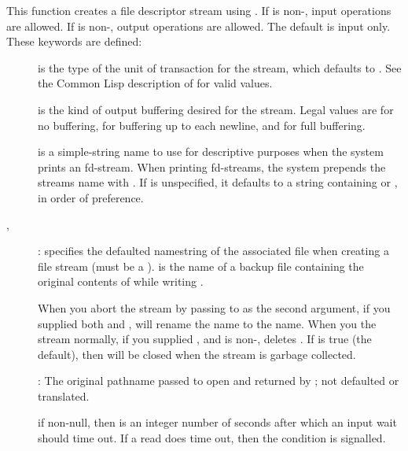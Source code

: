 {This function creates a file descriptor stream using .
If  is non-\nil, input operations are allowed.  If
 is non-\nil, output operations are allowed.  The default is
input only.  These keywords are defined:
\begin{description}
\item[] is the type of the unit of transaction for the
stream, which defaults to .  See the Common Lisp
description of  for valid values.

\item[] is the kind of output buffering desired for the stream.
Legal values are  for no buffering,  for buffering up to
each newline, and  for full buffering.

\item[] is a simple-string name to use for descriptive
purposes when the system prints an fd-stream.  When printing fd-streams,
the system prepends the streams name with .  If
 is unspecified, it defaults to a string containing 
or , in order of preference.

\item[, ]:  specifies the defaulted
namestring of the associated file when creating a file stream (must be a
).  is the  name of a
backup file containing the original contents of  while writing
.

When you abort the stream by passing \true{} to
 as the second argument, if you supplied both  and
,  will rename the  name to the
 name.  When you  the stream normally, if you supplied
, and  is non-\nil, 
deletes .  If  is true (the default), then
 will be closed when the stream is garbage collected.

\item[]: The original pathname passed to open and returned by
; not defaulted or translated.

\item[] if non-null, then  is an integer
number of seconds after which an input wait should time out.  If a read
does time out, then the  condition is signalled.
\end{description}
\enddefun

}

